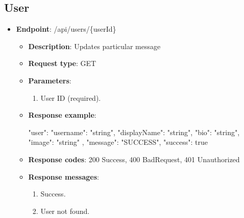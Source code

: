 \subsection{User}\label{subsec:user}
\begin{itemize}
    \item \textbf{Endpoint}: /api/users/\{userId\}
    \begin{itemize}
        \item \textbf{Description}: Updates particular message
        \item \textbf{Request type}: GET
        \item \textbf{Parameters}:
        \begin{enumerate}
            \item User ID (required).
        \end{enumerate}
        \item \textbf{Response example}:
        \begin{spverbatim}
        {
            "user": {
            "username": "string",
            "displayName": "string",
            "bio": "string",
            "image": "string"
            },
            "message": "SUCCESS",
            "success": true
        }
        \end{spverbatim}
        \item \textbf{Response codes}: 200 Success, 400 BadRequest, 401 Unauthorized
        \item \textbf{Response messages}:
        \begin{enumerate}
            \item Success.
            \item User not found.
        \end{enumerate}
    \end{itemize}
\end{itemize}